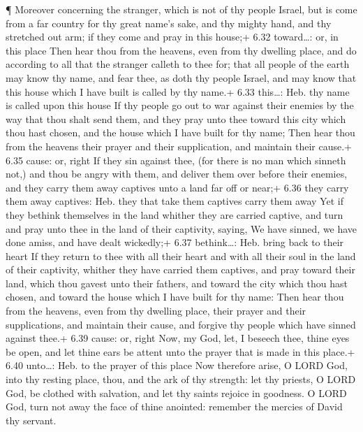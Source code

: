  ¶ Moreover concerning the stranger, which is not of thy
people Israel, but is come from a far country for thy great name's sake,
and thy mighty hand, and thy stretched out arm; if they come and pray in
this house;+ 6.32 toward\ldots: or, in this place  Then
hear thou from the heavens, even from thy dwelling place, and do
according to all that the stranger calleth to thee for; that all people
of the earth may know thy name, and fear thee, as doth thy people
Israel, and may know that this house which I have built is called by thy
name.+ 6.33 this\ldots: Heb. thy name is called upon this house
 If thy people go out to war against their enemies by the
way that thou shalt send them, and they pray unto thee toward this city
which thou hast chosen, and the house which I have built for thy name;
 Then hear thou from the heavens their prayer and their
supplication, and maintain their cause.+ 6.35 cause: or, right
 If they sin against thee, (for there is no man which
sinneth not,) and thou be angry with them, and deliver them over before
their enemies, and they carry them away captives unto a land far off or
near;+ 6.36 they carry them away captives: Heb. they that take them
captives carry them away  Yet if they bethink themselves in
the land whither they are carried captive, and turn and pray unto thee
in the land of their captivity, saying, We have sinned, we have done
amiss, and have dealt wickedly;+ 6.37 bethink\ldots: Heb. bring back to
their heart  If they return to thee with all their heart
and with all their soul in the land of their captivity, whither they
have carried them captives, and pray toward their land, which thou
gavest unto their fathers, and toward the city which thou hast chosen,
and toward the house which I have built for thy name:  Then
hear thou from the heavens, even from thy dwelling place, their prayer
and their supplications, and maintain their cause, and forgive thy
people which have sinned against thee.+ 6.39 cause: or, right
 Now, my God, let, I beseech thee, thine eyes be open, and
let thine ears be attent unto the prayer that is made in this place.+
6.40 unto\ldots: Heb. to the prayer of this place  Now
therefore arise, O LORD God, into thy resting place, thou, and the ark
of thy strength: let thy priests, O LORD God, be clothed with salvation,
and let thy saints rejoice in goodness.  O LORD God, turn
not away the face of thine anointed: remember the mercies of David thy
servant.

